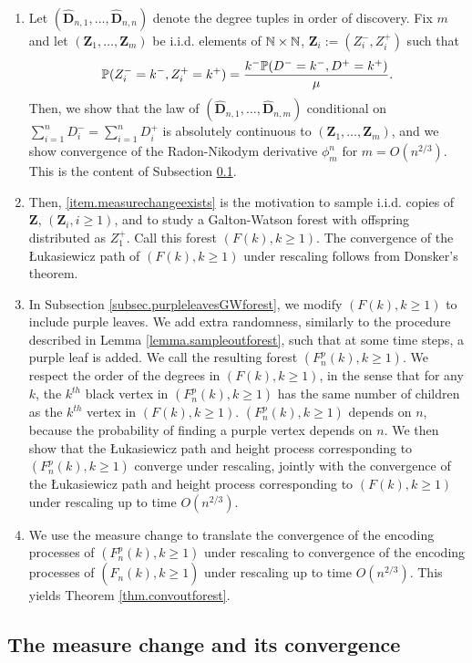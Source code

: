 \begin{enumerate}
    \item \label{item.measurechangeexists} Let $(\mathbf{\hat{D}}_{n,1},\dots,\mathbf{\hat{D}}_{n,n})$ denote the degree tuples in order of discovery. Fix $m$ and let $(\mathbf{Z}_1,\dots, \mathbf{Z}_m)$ be i.i.d. elements of $\N\times \N$, $\mathbf{Z}_i:=(Z_i^-,Z_i^+)$ such that 
    $$\P(Z_i^-=k^-, Z_i^+=k^+)=\frac{k^-\P(D^-=k^-,D^+=k^+)}{\mu}.$$
    Then, we show that the law of $(\mathbf{\hat{D}}_{n,1},\dots,\mathbf{\hat{D}}_{n,m})$ conditional on $\sum_{i=1}^n D_i^-=\sum_{i=1}^n D_i^+$ is absolutely continuous to $(\mathbf{Z}_1,\dots, \mathbf{Z}_m)$, and we show convergence of the Radon-Nikodym derivative $\phi_m^n$ for $m=O(n^{2/3})$. This is the content of Subsection \ref{subsec.measurechange}.
    \item Then, \ref{item.measurechangeexists} is the motivation to sample i.i.d. copies of $\mathbf{Z}$, $(\mathbf{Z}_i,i\geq 1)$, and to study a Galton-Watson forest with offspring distributed as $Z_1^+$. Call this forest $(F(k),k\geq 1)$. The convergence of the \L ukasiewicz path of $(F(k),k\geq 1)$ under rescaling follows from Donsker's theorem.
    \item In Subsection \ref{subsec.purpleleavesGWforest}, we modify $(F(k),k\geq 1)$ to include purple leaves. We add extra randomness, similarly to the procedure described in Lemma \ref{lemma.sampleoutforest}, such that at some time steps, a purple leaf is added. We call the resulting forest $(F^p_n(k),k\geq 1)$. We respect the order of the degrees in $(F(k),k\geq 1)$, in the sense that for any $k$, the $k^{th}$ black vertex in $(F^p_n(k),k\geq 1)$ has the same number of children as the $k^{th}$ vertex in $(F(k),k\geq 1)$. $(F^p_n(k),k\geq 1)$ depends on $n$, because the probability of finding a purple vertex depends on $n$. We then show that the \L ukasiewicz path and height process corresponding to $(F^p_n(k),k\geq 1)$ converge under rescaling, jointly with the convergence of the \L ukasiewicz path and height process corresponding to $(F(k),k\geq 1)$ under rescaling up to time $O(n^{2/3})$.
    \item We use the measure change to translate the convergence of the encoding processes of $(F^p_n(k),k\geq 1)$ under rescaling to convergence of the encoding processes of $(\hat{F}_n(k),k\geq 1)$ under rescaling up to time $O(n^{2/3})$. This yields Theorem \ref{thm.convoutforest}. 
\end{enumerate}

\subsection{The measure change and its convergence}\label{subsec.measurechange}

